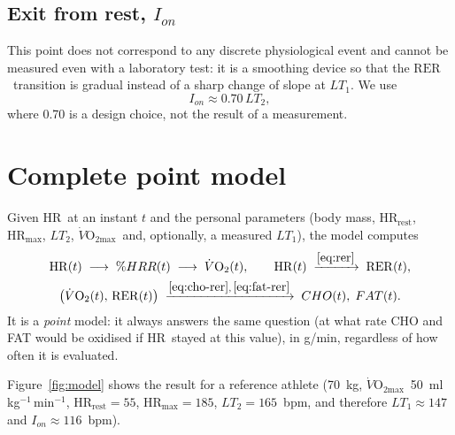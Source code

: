 \documentclass[10pt,a4paper]{article}
\newcommand{\VO}{\ensuremath{\dot V\mathrm{O_2}}}
\newcommand{\VOmax}{\ensuremath{\dot V\mathrm{O_{2max}}}}
\newcommand{\RER}{\ensuremath{\mathrm{RER}}}
\newcommand{\FC}{\ensuremath{\mathrm{HR}}}
\newcommand{\mlkgmin}{ml\,kg$^{-1}$\,min$^{-1}$}
\begin{document}
\subsection{Exit from rest, $I_{on}$}
This point does not correspond to any discrete physiological event and cannot be measured
even with a laboratory test: it is a smoothing device so that the \RER\ transition is
gradual instead of a sharp change of slope at $LT_1$. We use
\begin{equation}
  I_{on}\approx0.70\,LT_2 ,
\end{equation}
where 0.70 is a design choice, not the result of a measurement.

\section{Complete point model}\label{sec:complet}

Given \FC\ at an instant $t$ and the personal parameters (body mass, $\FC_{\mathrm{rest}}$,
$\FC_{\mathrm{max}}$, $LT_2$, \VOmax\ and, optionally, a measured $LT_1$), the model computes
\begin{gather}
  \FC(t)\;\longrightarrow\;\%HRR(t)\;\longrightarrow\;\VO(t),
  \qquad \FC(t)\;\xrightarrow{\eqref{eq:rer}}\;\RER(t),\notag\\
  \bigl(\VO(t),\,\RER(t)\bigr)\;\xrightarrow{\eqref{eq:cho-rer},\,\eqref{eq:fat-rer}}\;CHO(t),\;FAT(t).
\end{gather}
It is a \emph{point} model: it always answers the same question (at what rate CHO and FAT
would be oxidised if \FC\ stayed at this value), in g/min, regardless of how often it is
evaluated.

Figure~\ref{fig:model} shows the result for a reference athlete (70~kg, \VOmax\
50~\mlkgmin, $\FC_{\mathrm{rest}}=55$, $\FC_{\mathrm{max}}=185$, $LT_2=165$~bpm, and therefore
$LT_1\approx147$ and $I_{on}\approx116$~bpm).
\end{document}

